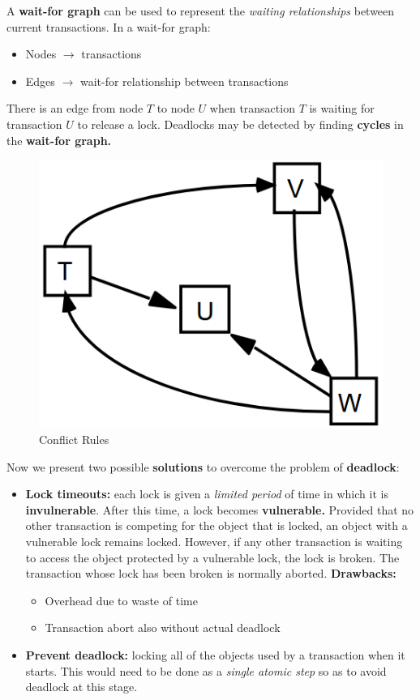 A \textbf{wait-for graph} can be used to represent the \textit{waiting relationships} between current transactions. In a wait-for graph:
\begin{itemize}
    \item Nodes \(\rightarrow\) transactions
    \item Edges \(\rightarrow\) wait-for relationship between transactions
\end{itemize}
There is an edge from node \(T\) to node \(U\) when transaction \(T\) is waiting for transaction \(U\) to release a lock. Deadlocks may be detected by finding \textbf{cycles} in the \textbf{wait-for graph.}

\begin{figure}[!h]
    \centering
    \includegraphics[width=.40\linewidth]{images/TransactionAndConcurrencyControl/wait-forGraph.png}
    \caption{Conflict Rules}
\end{figure}

Now we present two possible \textbf{solutions} to overcome the problem of \textbf{deadlock}:
\begin{itemize}
    \item \textbf{Lock timeouts:} each lock is given a \textit{limited period} of time in which it is \textbf{invulnerable}. After this time, a lock becomes \textbf{vulnerable.} Provided that no other transaction is competing for the object that is locked, an object with a vulnerable lock remains locked. However, if any other transaction is waiting to access the object protected by a vulnerable lock, the lock is broken. The transaction whose lock has been broken is normally aborted. \textbf{Drawbacks:}
    \begin{itemize}
        \item Overhead due to waste of time
        \item Transaction abort also without actual deadlock
    \end{itemize}
    \item \textbf{Prevent deadlock:} locking all of the objects used by a transaction when it starts. This would need to be done as a \textit{single atomic step} so as to avoid deadlock at this stage.
\end{itemize}

